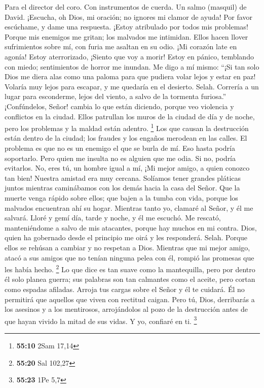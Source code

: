 Para el director del coro. Con instrumentos de cuerda. Un salmo
(masquil) de David.  ¡Escucha, oh Dios, mi oración; no
ignores mi clamor de ayuda!  Por favor escúchame, y dame una
respuesta. ¡Estoy atribulado por todos mis problemas! 
Porque mis enemigos me gritan; los malvados me intimidan. Ellos hacen
llover sufrimientos sobre mí, con furia me asaltan en su odio.
 ¡Mi corazón late en agonía! Estoy aterrorizado, ¡Siento que
voy a morir!  Estoy en pánico, temblando con miedo;
sentimientos de horror me inundan.  Me digo a mí mismo:
``¡Si tan solo Dios me diera alas como una paloma para que pudiera volar
lejos y estar en paz!  Volaría muy lejos para escapar, y me
quedaría en el desierto. Selah.  Correría a un lugar para
esconderme, lejos del viento, a salvo de la tormenta furiosa.''
 ¡Confúndelos, Señor! cambia lo que están diciendo, porque
veo violencia y conflictos en la ciudad.  Ellos patrullan
los muros de la ciudad de día y de noche, pero los problemas y la maldad
están adentro. \footnote{\textbf{55:10} 2Sam 17,14}  Los
que causan la destrucción están dentro de la ciudad; los fraudes y los
engaños merodean en las calles.  El problema es que no es
un enemigo el que se burla de mí. Eso hasta podría soportarlo. Pero
quien me insulta no es alguien que me odia. Si no, podría evitarlos.
 No, eres tú, un hombre igual a mí, ¡Mi mejor amigo, a
quien conozco tan bien!  Nuestra amistad era muy cercana.
Solíamos tener grandes pláticas juntos mientras caminábamos con los
demás hacia la casa del Señor.  Que la muerte venga rápido
sobre ellos; que bajen a la tumba con vida, porque los malvados
encuentran ahí su hogar.  Mientras tanto yo, clamaré al
Señor, y él me salvará.  Lloré y gemí día, tarde y noche, y
él me escuchó.  Me rescató, manteniéndome a salvo de mis
atacantes, porque hay muchos en mi contra.  Dios, quien ha
gobernado desde el principio me oirá y les responderá. Selah. Porque
ellos se rehúsan a cambiar y no respetan a Dios.  Mientras
que mi mejor amigo, atacó a sus amigos que no tenían ninguna pelea con
él, rompió las promesas que les había hecho. \footnote{\textbf{55:20}
  Sal 102,27}  Lo que dice es tan suave como la
mantequilla, pero por dentro él solo planea guerra; sus palabras son tan
calmantes como el aceite, pero cortan como espadas afiladas.
 Arroja tus cargas sobre el Señor y él te cuidará. Él no
permitirá que aquellos que viven con rectitud caigan.  Pero
tú, Dios, derribarás a los asesinos y a los mentirosos, arrojándolos al
pozo de la destrucción antes de que hayan vivido la mitad de sus vidas.
Y yo, confiaré en ti. \footnote{\textbf{55:23} 1Pe 5,7}

